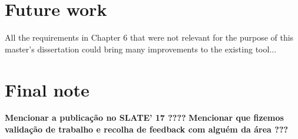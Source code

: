\section{Future work}
All the requirements in Chapter 6 that were not relevant for the purpose of this master's dissertation could bring many improvements to the existing tool...

\section{Final note}
\textbf{Mencionar a publicação no SLATE' 17 ????}
\textbf{Mencionar que fizemos validação de trabalho e recolha de feedback com alguém da área ???}


